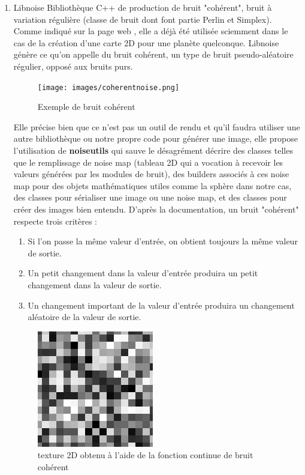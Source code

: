 \documentclass[12pt]{report}
\begin{document}
\begin{enumerate}
    \item Libnoise
    Bibliothèque C++ de production de bruit "cohérent", bruit à variation régulière (classe de bruit dont font partie Perlin et Simplex). Comme indiqué sur la page web \cite{libnoisewebsite}, elle a déjà été utilisée sciemment dans le cas de la création d'une carte 2D pour une planète quelconque. Libnoise génère ce qu'on appelle du bruit cohérent, un type de bruit pseudo-aléatoire régulier, opposé aux bruits purs.
    
    \begin{figure}[h]
    \centering
    \texttt{[image: images/coherentnoise.png]}
    \caption{Exemple de bruit cohérent}

    \end{figure}
 
    Elle précise bien que ce n'est pas un outil de rendu et qu'il faudra utiliser une autre bibliothèque ou notre propre code pour générer une image, elle propose l'utilisation de \textbf{noiseutils} qui sauve le désagrément décrire des classes telles que le remplissage de noise map (tableau 2D qui a vocation à recevoir les valeurs générées par les modules de bruit), des builders associés à ces noise map pour des objets mathématiques utiles comme la sphère dans notre cas, des classes pour sérialiser une image ou une noise map, et des classes pour créer des images bien entendu. 
     \newline D'après la documentation, un bruit "cohérent" respecte trois critères :
    \begin{enumerate}
        \item Si l'on passe la même valeur d'entrée, on obtient toujours la même valeur de sortie.
        \item Un petit changement dans la valeur d'entrée produira un petit changement dans la valeur de sortie.
        \item Un changement important de la valeur d'entrée produira un changement aléatoire de la valeur de sortie.
    \end{enumerate}
    
    \begin{figure}[h]
        \centering
        \includegraphics[scale = 0.5]{images/continuousintnoise2d.png}
        \caption{texture 2D obtenu à l'aide de la fonction continue de bruit cohérent}
    \end{figure}
    

\end{enumerate}
\end{document}
